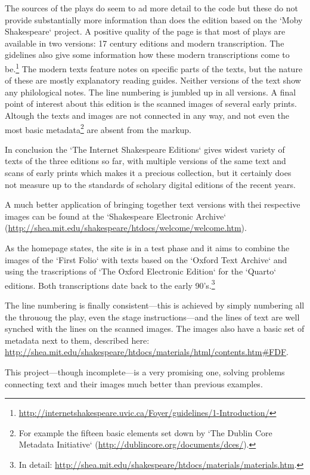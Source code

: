 The sources of the plays do seem to ad more detail to the code but these do not provide substantially more information than does the edition based on the `Moby Shakespeare` project. A positive quality of the page is  that most of plays are available in two versions: 17 century editions and modern transcription. The gidelines also give some information how these modern transcriptions come to be.\footnote{\url{http://internetshakespeare.uvic.ca/Foyer/guidelines/1-Introduction/}} The modern texts feature notes on specific parts of the texts, but the nature of these are mostly explanatory reading guides. Neither versions of the text show any philological notes. The line numbering is jumbled up in all versions.
A final point of interest about this edition is the scanned images of several early prints. Altough the texts and images are not connected in any way, and not even the most basic metadata\footnote{For example the fifteen basic elements set down by `The Dublin Core Metadata Initiative` (\url{http://dublincore.org/documents/dces/}).} are absent from the markup.

In conclusion the `The Internet Shakespeare Editions` gives widest variety of texts of the three editions so far, with multiple versions of the same text and scans of early prints which makes it a precious collection, but it certainly does not measure up to the standards of scholary digital editions of the recent years.

A much better application of bringing together text versions with thei respective images can be found at the `Shakespeare Electronic Archive` (\url{http://shea.mit.edu/shakespeare/htdocs/welcome/welcome.htm}).

As the homepage states, the site is in a test phase and it aims to combine the images of the `First Folio` with texts based on the `Oxford Text Archive` and using the trascriptions of `The Oxford Electronic Edition` for the `Quarto` editions. Both transcriptions date back to the early 90's.\footnote{In detail: \url{http://shea.mit.edu/shakespeare/htdocs/materials/materials.htm}.} 

The line numbering is finally consistent---this is achieved by simply numbering all the thrououg the play, even the stage instructions---and the lines of text are well synched with the lines on the scanned images. The images also have a basic set of metadata next to them, described here: \url{http://shea.mit.edu/shakespeare/htdocs/materials/html/contents.htm#FDF}.

This project---though incomplete---is a very promising one, solving problems connecting text and their images much better than previous examples.

